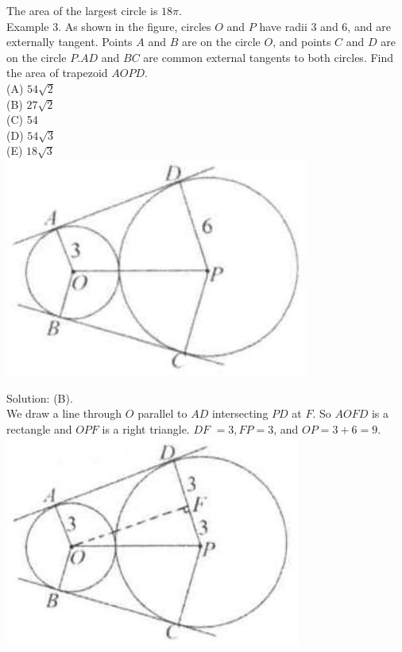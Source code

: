 \documentclass[10pt]{article}
\begin{document}
The area of the largest circle is \(18 \pi\).\\
Example 3. As shown in the figure, circles \(O\) and \(P\) have radii 3 and 6, and are externally tangent. Points \(A\) and \(B\) are on the circle \(O\), and points \(C\) and \(D\) are on the circle \(P . A D\) and \(B C\) are common external tangents to both circles. Find the area of trapezoid \(A O P D\).\\
(A) \(54 \sqrt{2}\)\\
(B) \(27 \sqrt{2}\)\\
(C) 54\\
(D) \(54 \sqrt{3}\)\\
(E) \(18 \sqrt{3}\)\\
\includegraphics[max width=\textwidth, center]{2025_04_17_97bc1f7e44d93c271a88g-177(2)}

Solution: (B).\\
We draw a line through \(O\) parallel to \(A D\) intersecting \(P D\) at \(F\). So \(A O F D\) is a rectangle and \(O P F\) is a right triangle. \(D F\) \(=3, F P=3\), and \(O P=3+6=9\).\\
\includegraphics[max width=\textwidth, center]{2025_04_17_97bc1f7e44d93c271a88g-177}
\end{document}
